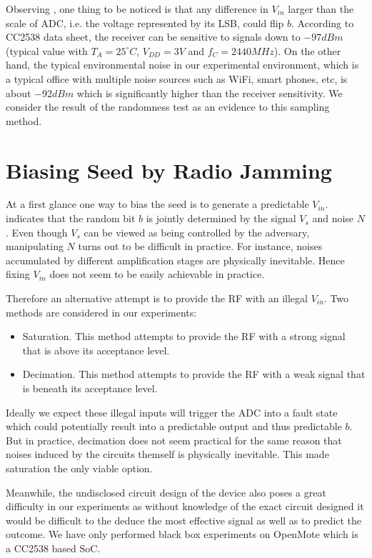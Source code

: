 Observing , one thing to be noticed is that any difference in $V_{in}$ larger than the scale of ADC, i.e. the voltage represented by its LSB, could flip $b$. According to CC2538 data sheet\cite{CC2538Datasheet}, the receiver can be sensitive to signals down to $-97dBm$ (typical value with $T_A = 25^{\circ}C$, $V_{DD} = 3V$ and $f_{C} = 2440MHz$). On the other hand, the typical environmental noise in our experimental environment, which is a typical office with multiple noise sources such as  WiFi, smart phones, etc, is about $-92dBm$ which is significantly higher than the receiver sensitivity. We consider the result of the randomness test as an evidence to this sampling method.

\section{Biasing Seed by Radio Jamming}
At a first glance one way to bias the seed is to generate a predictable $V_{in}$.  indicates that the random bit $b$ is jointly determined by the signal $V_s$ and noise $N$. Even though $V_s$ can be viewed as being controlled by the adversary, manipulating $N$ turns out to be difficult in practice. For instance, noises accumulated by different amplification stages are physically inevitable. Hence fixing $V_{in}$ does not seem to be easily achievable in practice.

Therefore an alternative attempt is to provide the RF with an illegal $V_{in}$. Two methods are considered in our experiments:
\begin{itemize}
	\item Saturation. This method attempts to provide the RF with a strong signal that is above its acceptance level.
	\item Decimation. This method attempts to provide the RF with a weak signal that is beneath its acceptance level.
\end{itemize}

Ideally we expect these illegal inputs will trigger the ADC into a fault state which could potentially result into a predictable output and thus predictable $b$. But in practice, decimation does not seem practical for the same reason that noises induced by the circuits themself is physically inevitable. This made saturation the only viable option.

Meanwhile, the undisclosed circuit design of the device also poses a great difficulty in our experiments as without knowledge of the exact circuit designed it would be difficult to the deduce the most effective signal as well as to predict the outcome. We have only performed black box experiments on OpenMote\cite{OpenMote} which is a CC2538 based SoC.

